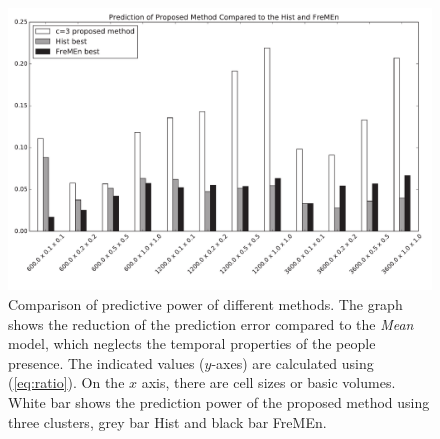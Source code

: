 %


\begin{figure}[!t]
\begin{center}
    \includegraphics[width=1.0\columnwidth]{fig/ours3_hist_fremen.pdf}
    \caption{Comparison of predictive power of different methods. 
The graph shows the reduction of the prediction error compared to the \textit{Mean} model, which neglects the temporal properties of the people presence.
The indicated values ($y$-axes) are calculated using (\ref{eq:ratio}). 
On the $x$ axis, there are cell sizes or basic volumes.
White bar shows the prediction power of the proposed method using three clusters, grey bar Hist and black bar FreMEn.\label{graph:pedestrians}}
\end{center}
\end{figure}

